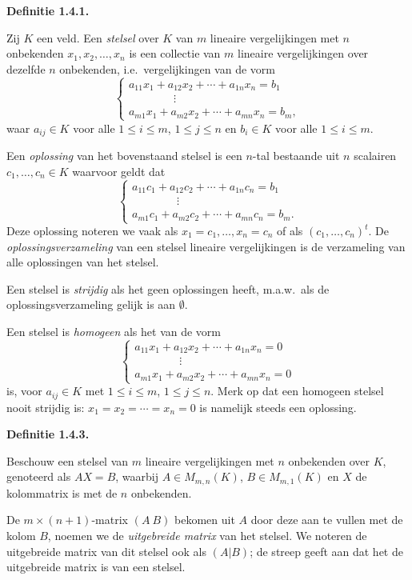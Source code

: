 \documentclass[10pt,a4paper]{article}
\newenvironment{res}[1]{%
  \par\noindent\textbf{Definitie #1.}~\ignorespaces
}{%
  \par\vspace{2pt}\normalfont
}
\begin{document}
\begin{res}{1.4.1}
\begin{myenum}
\item Zij $K$ een veld. Een \textit{stelsel} over $K$ van $m$ lineaire vergelijkingen met $n$ onbekenden $x_1,x_2,\dots,x_n$ is een collectie van $m$ lineaire vergelijkingen over dezelfde $n$ onbekenden, i.e.\ vergelijkingen van de vorm
\[
\begin{cases} a_{11}x_1+a_{12}x_2+\cdots+a_{1n}x_n=b_1\\ \qquad\qquad\vdots\\ a_{m1}x_1+a_{m2}x_2+\cdots+a_{mn}x_n=b_m,\end{cases}
\]
waar $a_{ij}\in K$ voor alle $1\le i\le m$, $1\le j\le n$ en $b_i\in K$ voor alle $1\le i\le m$.
\item Een \textit{oplossing} van het bovenstaand stelsel is een $n$-tal bestaande uit $n$ scalairen $c_1,\dots,c_n\in K$ waarvoor geldt dat
\[
\begin{cases} a_{11}c_1+a_{12}c_2+\cdots+a_{1n}c_n=b_1\\ \qquad\qquad\vdots\\ a_{m1}c_1+a_{m2}c_2+\cdots+a_{mn}c_n=b_m.\end{cases}
\]
Deze oplossing noteren we vaak als $x_1=c_1,\dots,x_n=c_n$ of als $(c_1,\dots,c_n)^t$. De \textit{oplossingsverzameling} van een stelsel lineaire vergelijkingen is de verzameling van alle oplossingen van het stelsel.
\item Een stelsel is \textit{strijdig} als het geen oplossingen heeft, m.a.w.\ als de oplossingsverzameling gelijk is aan $\emptyset$.
\item Een stelsel is \textit{homogeen} als het van de vorm
\[
\begin{cases} a_{11}x_1+a_{12}x_2+\cdots+a_{1n}x_n=0\\ \qquad\qquad\vdots\\ a_{m1}x_1+a_{m2}x_2+\cdots+a_{mn}x_n=0\end{cases}
\]
is, voor $a_{ij}\in K$ met $1\le i\le m$, $1\le j\le n$. Merk op dat een homogeen stelsel nooit strijdig is: $x_1=x_2=\cdots=x_n=0$ is namelijk steeds een oplossing.
\end{myenum}
\end{res}

\begin{res}{1.4.3}
Beschouw een stelsel van $m$ lineaire vergelijkingen met $n$ onbekenden over $K$, genoteerd als $AX=B$, waarbij $A\in M_{m,n}(K)$, $B\in M_{m,1}(K)$ en $X$ de kolommatrix is met de $n$ onbekenden.

De $m\times(n+1)$-matrix $(A\ B)$ bekomen uit $A$ door deze aan te vullen met de kolom $B$, noemen we de \textit{uitgebreide matrix} van het stelsel. We noteren de uitgebreide matrix van dit stelsel ook als $(A|B)$; de streep geeft aan dat het de uitgebreide matrix is van een stelsel.
\end{res}
\end{document}
